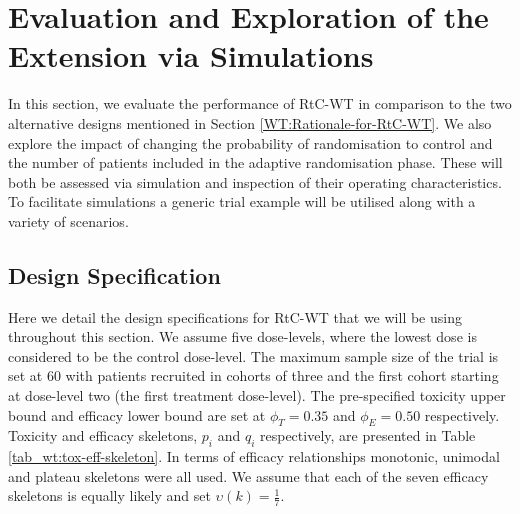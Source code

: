 \section{Evaluation and Exploration of the Extension via Simulations}
\label{WT:Evaluation-of-the-Extension}

In this section, we evaluate the performance of RtC-WT in comparison to the two alternative designs mentioned in Section \ref{WT:Rationale-for-RtC-WT}. We also explore the impact of changing the probability of randomisation to control and the number of patients included in the adaptive randomisation phase. These will both be assessed via simulation and inspection of their operating characteristics. To facilitate simulations a generic trial example will be utilised along with a variety of scenarios. 

\subsection{Design Specification}
\label{WT:Design-Spec}

Here we detail the design specifications for RtC-WT that we will be using throughout this section. We assume five dose-levels, where the lowest dose is considered to be the control dose-level. The maximum sample size of the trial is set at 60 with patients recruited in cohorts of three and the first cohort starting at dose-level two (the first treatment dose-level). The pre-specified toxicity upper bound and efficacy lower bound are set at $\phi_T = 0.35$ and $\phi_E = 0.50$ respectively. Toxicity and efficacy skeletons, $p_i$ and $q_i$ respectively, are presented in Table \ref{tab_wt:tox-eff-skeleton}. In terms of efficacy relationships monotonic, unimodal and plateau skeletons were all used. We assume that each of the seven efficacy skeletons is equally likely and set $\upsilon(k) = \frac{1}{7}$. 


